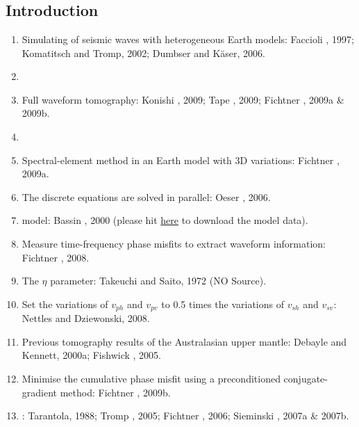 \renewcommand{\pmk}{Fichtner\_2010\_EPSL\_Full waveform tomography}
\renewcommand{\prf}{FWI/\pmk.pdf}
\renewcommand{\pti}{Full waveform tomography for radially anisotropic structure: New insights into present and past states of the Australasian upper mantle}
\renewcommand{\pay}{Andreas Fichtner, Brian L. N. Kennett and Heiner Igel \etal, 2010}
\renewcommand{\pjo}{Earth and Planetary Science Letters}
\renewcommand{\pda}{2016/10/13 Thu.}
\section{\pinfo}
\subsection{Introduction}
\begin{enumerate}[\hspace{10mm}*]
  \item Simulating of seismic waves with heterogeneous Earth models: Faccioli \etal, 1997; Komatitsch and Tromp, 2002; Dumbser and K\"{a}ser, 2006.
  \item \sline
  \item Full waveform tomography: Konishi \etal, 2009; Tape \etal, 2009; Fichtner \etal, 2009a \& 2009b.
  \item \sline
  \item Spectral-element method in an Earth model with 3D variations: Fichtner \etal, 2009a.
  \item The discrete equations are solved in parallel: Oeser \etal, 2006.
  \item {} model: Bassin \etal, 2000 (please hit \href{http://igppweb.ucsd.edu/~gabi/crust2.html}{here} to download the model data).
  \item Measure time-frequency phase misfits to extract waveform information: Fichtner \etal, 2008.
  \item The $\eta$ parameter: Takeuchi and Saito, 1972 (NO Source).
  \item Set the variations of $v_{ph}$ and $v_{pv}$ to 0.5 times the variations of $v_{sh}$ and $v_{sv}$: Nettles and Dziewonski, 2008.
  \item Previous tomography results of the Australasian upper mantle: Debayle and Kennett, 2000a; Fishwick \etal, 2005.
  \item Minimise the cumulative phase misfit using a preconditioned conjugate-gradient method: Fichtner \etal, 2009b.
  \item {}: Tarantola, 1988; Tromp \etal, 2005; Fichtner \etal, 2006; Sieminski \etal, 2007a \& 2007b.

\end{enumerate}
